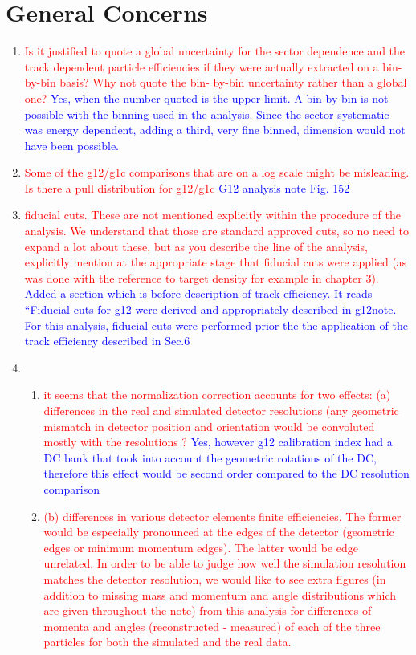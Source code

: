\documentclass[11pt,a4paper]{article}
\begin{document}
\section*{General Concerns}
\begin{enumerate}
\item
\textcolor{red}{Is it justified to quote a global uncertainty for the sector dependence and the track dependent particle efficiencies if they were actually extracted on a bin-by-bin basis? Why not quote the bin- by-bin uncertainty rather than a global one?}
\textcolor{blue}{Yes, when the number quoted is the upper limit. A bin-by-bin is not possible with the binning used in the analysis. Since the sector systematic was energy dependent, adding a third, very fine binned, dimension would not have been possible. }
\item
\textcolor{red}{Some of the g12/g1c comparisons that are on a log scale might be misleading. Is there a pull distribution for g12/g1c}
\textcolor{blue}{G12 analysis note Fig. 152}
\item
\textcolor{red}{fiducial cuts. These are not mentioned explicitly within the procedure of the analysis. We understand that those are standard approved cuts, so no need to expand a lot about these, but as you describe the line of the analysis, explicitly mention at the appropriate stage that fiducial cuts were applied (as was done with the reference to target density for example in chapter 3).}
\textcolor{blue}{Added a section which is before description of track efficiency. It reads ``Fiducial cuts for g12 were derived and appropriately described in g12note. For this analysis, fiducial cuts were performed prior the the application of the track efficiency described in Sec.6 }
\item
\begin{enumerate}
\item
\textcolor{red}{it seems that the normalization correction accounts for two effects: (a) differences in the real and simulated detector resolutions (any geometric mismatch in detector position and orientation would be convoluted mostly with the resolutions ?}
\textcolor{blue}{Yes, however g12 calibration index had a DC bank that took into account the geometric rotations of the DC, therefore this effect would be second order compared to the DC resolution comparison}
\item 
\textcolor{red}{(b) differences in various detector elements finite efficiencies. The former would be especially pronounced at the edges of the detector (geometric edges or minimum momentum edges). The latter would be edge unrelated. In order to be able to judge how well the simulation resolution matches the detector resolution, we would like to see extra figures (in addition to missing mass and momentum and angle distributions which are given throughout the note) from this analysis for differences of momenta and angles (reconstructed - measured) of each of the three particles for both the simulated and the real data.}

\end{enumerate}
\end{enumerate}
\end{document}
